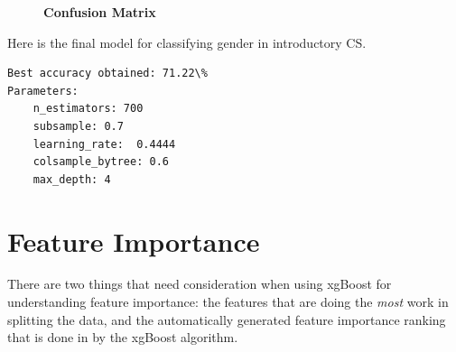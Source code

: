 \begin{figure}[!hbtp]
\centering

    \caption{\textbf{Confusion Matrix}}
\end{figure}

Here is the final model for classifying gender in introductory CS. 
\begin{verbatim}
Best accuracy obtained: 71.22\%
Parameters:
    n_estimators: 700
    subsample: 0.7
    learning_rate:  0.4444
    colsample_bytree: 0.6
    max_depth: 4

\end{verbatim}


\section*{Feature Importance}
There are two things that need consideration when using xgBoost for understanding feature importance: the features that are doing the \emph{most} work in splitting the data, and the automatically generated feature importance ranking that is done in by the xgBoost algorithm.

